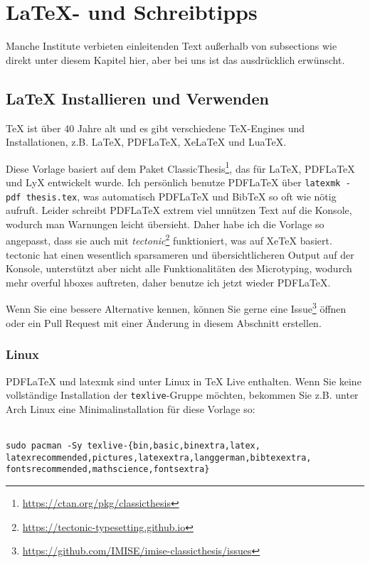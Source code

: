 \chapter{\LaTeX{}- und Schreibtipps}
Manche Institute verbieten einleitenden Text außerhalb von subsections wie direkt unter diesem Kapitel hier, aber bei uns ist das ausdrücklich erwünscht.

\section{\LaTeX{} Installieren und Verwenden}
\TeX{} ist über 40 Jahre alt und es gibt verschiedene \TeX{}-Engines und Installationen\footnotemark{}, z.B. \LaTeX{}, PDF\LaTeX{}, Xe\LaTeX{} und Lua\TeX{}.

Diese Vorlage basiert auf dem Paket ClassicThesis\footnote{\url{https://ctan.org/pkg/classicthesis}}, das für \LaTeX{}, PDF\LaTeX{} und LyX entwickelt wurde.
Ich persönlich benutze PDF\LaTeX{} über \texttt{latexmk -pdf thesis.tex}, was automatisch PDF\LaTeX{} und Bib\TeX{} so oft wie nötig aufruft.
Leider schreibt PDF\LaTeX{} extrem viel unnützen Text auf die Konsole, wodurch man Warnungen leicht übersieht.
Daher habe ich die Vorlage so angepasst, dass sie auch mit \emph{tectonic}\footnote{\url{https://tectonic-typesetting.github.io}} funktioniert, was auf Xe\TeX{} basiert.
tectonic hat einen wesentlich sparsameren und übersichtlicheren Output auf der Konsole, unterstützt aber nicht alle Funktionalitäten des Microtyping, wodurch mehr overful hboxes auftreten, daher benutze ich jetzt wieder PDF\LaTeX{}.

Wenn Sie eine bessere Alternative kennen, können Sie gerne eine Issue\footnote{\url{https://github.com/IMISE/imise-classicthesis/issues}} öffnen oder ein Pull Request mit einer Änderung in diesem Abschnitt erstellen.

\subsection{Linux}

PDF\LaTeX{} und latexmk sind unter Linux in \TeX{} Live enthalten.
Wenn Sie keine vollständige Installation der \texttt{texlive}-Gruppe möchten, bekommen Sie z.B. unter Arch Linux eine Minimalinstallation für diese Vorlage so:\\
~\\
{\raggedright\texttt{sudo pacman -Sy texlive-\{bin,basic,binextra,latex,\\%
latexrecommended,pictures,latexextra,langgerman,bibtexextra,\\%
fontsrecommended,mathscience,fontsextra\}}}

